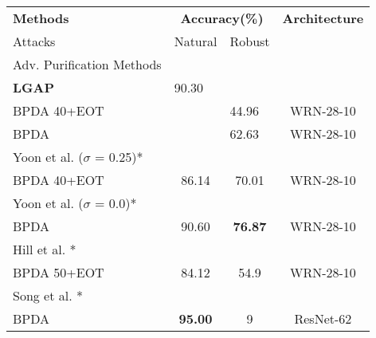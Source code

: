 \begin{table}[th]
\small
\centering
\begin{tabular}{lccc}
\hline
\textbf{Methods}                           & \multicolumn{2}{c}{\textbf{Accuracy(\%)}}                         & \textbf{Architecture} \\ 
\qquad Attacks                          & \multicolumn{1}{l}{Natural} & \multicolumn{1}{l}{Robust} & \multicolumn{1}{l}{}  \\ \hline
Adv. Purification Methods & \multicolumn{1}{l}{}        & \multicolumn{1}{l}{}       & \multicolumn{1}{l}{}  \\
\textbf{LGAP}                             & \multicolumn{1}{l}{90.30}   & \multicolumn{1}{l}{}       & \multicolumn{1}{l}{}  \\
\qquad BPDA 40+EOT                      & \multicolumn{1}{l}{}        & \multicolumn{1}{l}{44.96}  & WRN-28-10           \\
\qquad BPDA                             & \multicolumn{1}{l}{}        & \multicolumn{1}{l}{62.63}  & WRN-28-10             \\
Yoon et al. \cite{yoon2021adversarial} (\( \sigma \) = 0.25)*                   &                             &                            &                       \\
\qquad BPDA 40+EOT                      & 86.14                       & 70.01                      & WRN-28-10             \\
Yoon et al. \cite{yoon2021adversarial} (\( \sigma \) = 0.0)*                    &                             &                            &                       \\
\qquad BPDA                             & 90.60                        & \textbf{76.87}                      & WRN-28-10             \\
Hill et al. \cite{hill2020stochastic}*              &                             &                            &                       \\
\qquad BPDA 50+EOT                      & 84.12                       & 54.9                       & WRN-28-10             \\
Song et al. \cite{song2018pixeldefend}*             &                             &                            &                       \\
\qquad BPDA                             & \textbf{95.00}                          & 9                          & ResNet-62             \\

\end{tabular}
\end{table}
